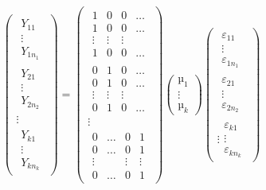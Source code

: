 \[
\begin{pmatrix}
\begin{matrix} Y_{11}\\\vdots \\Y_{1n_1}\end{matrix}\\\hline
\begin{matrix} Y_{21}\\\vdots \\Y_{2n_2}\end{matrix}\\\hline
\vdots\\\hline
\begin{matrix} Y_{k1}\\\vdots \\Y_{kn_k}\end{matrix}
\end{pmatrix}
 = 
\begin{pmatrix}
	\begin{matrix}
		1&0&0&\dots\\
		1&0&0&\dots\\
		\vdots&\vdots&\vdots&\\
		1&0&0&\dots
	\end{matrix}\\\hline
	\begin{matrix}
		0&1&0&\dots\\
		0&1&0&\dots\\
		\vdots&\vdots&\vdots&\\
		0&1&0&\dots
	\end{matrix}\\\hline 
	\vdots \\\hline
	\begin{matrix}
		0&\dots&0&1\\
		0&\dots&0&1\\
		\vdots&&\vdots&\vdots\\
		0&\dots&0&1
	\end{matrix} 
\end{pmatrix}
\begin{pmatrix} µ_1 \\ \vdots \\µ_k \end{pmatrix}
\begin{pmatrix}
	\begin{matrix} ε_{11}\\\vdots \\ε_{1n_1}\end{matrix}\\\hline
	\begin{matrix} ε_{21}\\\vdots \\ε_{2n_2}\end{matrix}\\\hline
	\vdots
	\begin{matrix} ε_{k1}\\\vdots \\ε_{kn_k}\end{matrix}
\end{pmatrix}
\]



